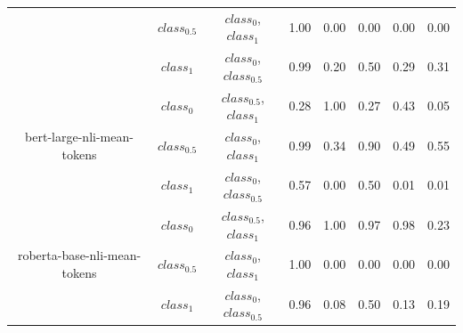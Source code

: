 \documentclass{ieeeaccess}
\begin{document}
\begin{table}[h!]
\begin{tabular}{|c|c|c|l|l|l|l|l|}
		& $class_{0.5}$                     & $class_0$,$class_1$                   & 1.00                                   & 0.00                                    & 0.00                                 & 0.00                              & 0.00                              \\ \cline{2-8} 
		& $class_1$                       & $class_0$,$class_{0.5}$                 & 0.99                                   & 0.20                                    & 0.50                                 & 0.29                              & 0.31                              \\ \hline
		\multirow{3}{*}{bert-large-nli-mean-tokens}           & $class_0$                     & $class_{0.5}$,$class_1$                   & 0.28                                   & 1.00                                    & 0.27                                 & 0.43                              & 0.05                              \\ \cline{2-8} 
		& $class_{0.5}$                     & $class_0$,$class_1$                   & 0.99                                   & 0.34                                    & 0.90                                 & 0.49                              & 0.55                              \\ \cline{2-8} 
		& $class_1$                       & $class_0$,$class_{0.5}$                 & 0.57                                   & 0.00                                    & 0.50                                 & 0.01                              & 0.01                              \\ \hline
		\multirow{3}{*}{roberta-base-nli-mean-tokens}         & $class_0$                     & $class_{0.5}$,$class_1$                   & 0.96                                   & 1.00                                    & 0.97                                 & 0.98                              & 0.23                              \\ \cline{2-8} 
		& $class_{0.5}$                     & $class_0$,$class_1$                   & 1.00                                   & 0.00                                    & 0.00                                 & 0.00                              & 0.00                              \\ \cline{2-8} 
		& $class_1$                       & $class_0$,$class_{0.5}$                 & 0.96                                   & 0.08                                    & 0.50                                 & 0.13                              & 0.19                              \\ \hline

\end{tabular}
\end{table}
\end{document}
